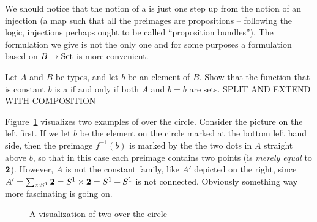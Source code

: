 We should notice that the notion of a \covering is just one step up from the notion of an
injection (a map such that all the preimages are propositions -- 
following the logic, injections perhaps ought to be called ``proposition bundles''). 
The formulation we give is not the only one and for some purposes a formulation
based on $B\to\mathord{\mathrm{Set}}$ is more convenient.

\begin{xca}\label{xca:constant-cover}
Let $A$ and $B$ be types, and let $b$ be an element of $B$.
Show that the function that is constant $b$ is a \covering
if and only if both $A$ and $b=b$ are sets. SPLIT AND EXTEND WITH COMPOSITION
\end{xca}

Figure~\ref{fig:covering} visualizes two examples of \coverings over the circle.  
Consider the picture on the left first.  
If we let $b$ be the element on the circle marked at the bottom left hand side, then the preimage $f^{-1}(b)$ is marked by the the two dots in $A$ straight above $b$, 
so that in this case each preimage contains two points (is \emph{merely equal} to $\mathbf{2}$).  
However, $A$ is not the constant family, like $A'$ depicted on the right, since 
$A'=\sum_{z:{S^1}}\mathbf{2}={S^1}\times\mathbf{2}={S^1}+{S^1}$ is not connected.  
Obviously something way more fascinating is going on.
\begin{figure}[hbt]
  \centering
  \caption{A visualization of two \coverings over the circle}
  \label{fig:covering}
\end{figure}

